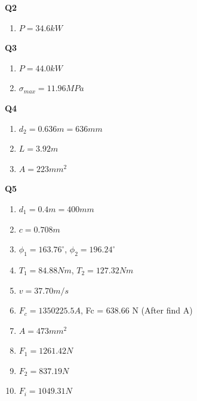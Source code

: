 \documentclass[a4paper, fleqn]{article}
\begin{document}
\textbf{Q2}
\begin{enumerate}[label=(\roman*)]
    \item $P = 34.6 kW$
\end{enumerate}

\textbf{Q3}
\begin{enumerate}[label=(\roman*)]
    \item $P = 44.0 kW$
    \item $\sigma_{max} = 11.96 MPa$
\end{enumerate}

\textbf{Q4}
\begin{enumerate}[label=(\roman*)]
    \item $d_2 = 0.636 m = 636 mm$
    \item $L = 3.92 m$
    \item $A = 223 mm^2$
\end{enumerate}

\textbf{Q5}
\begin{enumerate}[label=(\roman*)]
    \item $d_1 = 0.4 m = 400 mm$
    \item $c = 0.708 m$
    \item $\phi_1 = 163.76^{\circ}$, $\phi_2 = 196.24^{\circ}$
    \item $T_1 = 84.88 Nm$, $T_2 = 127.32 Nm$
    \item $v = 37.70 m/s$
    \item $F_c = 1350225.5 A$, Fc = 638.66 N (After find A)
    \item $A = 473 mm^2$
    \item $F_1 = 1261.42 N$
    \item $F_2 = 837.19 N$
    \item $F_i = 1049.31 N$
\end{enumerate}
\end{document}
